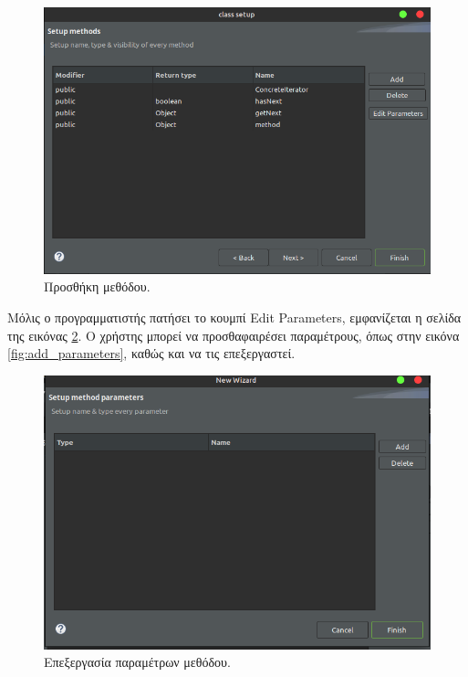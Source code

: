 \begin{figure}[H]
    \centering
    \includegraphics[width=1.0\textwidth]{Figures/add_method.png}
    \caption{Προσθήκη μεθόδου.}
    \label{fig:add_method}
\end{figure}
Μόλις ο προγραμματιστής πατήσει το κουμπί Edit Parameters, εμφανίζεται η σελίδα της εικόνας \ref{fig:edit_parameters}. 
Ο χρήστης μπορεί να προσθαφαιρέσει παραμέτρους, όπως στην εικόνα \ref{fig:add_parameters}, καθώς και να τις επεξεργαστεί.
\begin{figure}[H]
    \centering
    \includegraphics[width=1.0\textwidth]{Figures/edit_parameters.png}
    \caption{Επεξεργασία παραμέτρων μεθόδου.}
    \label{fig:edit_parameters}
\end{figure}
